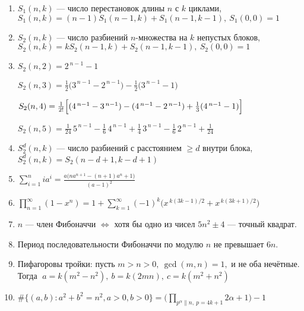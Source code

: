 \begin{enumerate}
\item %
$S_1(n,k)$ — число перестановок длины $n$ с $k$ циклами,
$S_1(n,k)=(n-1)S_1(n-1,k)+S_1(n-1,k-1),\ S_1(0,0)=1$

\item %
$S_2(n,k)$ — число разбиений $n$-множества на $k$ непустых блоков,
$S_2(n,k)=kS_2(n-1,k)+S_2(n-1,k-1),\ S_2(0,0)=1$

\item %
$S_2(n,2)=2^{\,n-1}-1$

$S_2(n,3)=\tfrac{1}{2}\bigl(3^{\,n-1}-2^{\,n-1}\bigr)-\tfrac{1}{2}\bigl(3^{\,n-1}-1\bigr)$

$S_2(n,4)=\tfrac{1}{2!}\Bigl[(4^{\,n-1}-3^{\,n-1})-(4^{\,n-1}-2^{\,n-1})+\tfrac{1}{3}(4^{\,n-1}-1)\Bigr]$

$S_2(n,5)=\tfrac{1}{24}\,5^{\,n-1}-\tfrac{1}{6}\,4^{\,n-1}
+\tfrac{1}{4}\,3^{\,n-1}-\tfrac{1}{6}\,2^{\,n-1}+\tfrac{1}{24}$

\item %
$S_2^d(n,k)$ — число разбиений с расстоянием $\ge d$ внутри блока,
$S_2^d(n,k)=S_2(n-d+1,k-d+1)$

\item %
$\sum_{i=1}^n i a^i=\frac{a\bigl(n a^{n+1}-(n+1)a^n+1\bigr)}{(a-1)^2}$

\item %
$\prod_{n=1}^\infty(1-x^n)=1+\sum_{k=1}^{\infty}(-1)^k\bigl(x^{\,k(3k-1)/2}+x^{\,k(3k+1)/2}\bigr)$

\item %
$n$ — член Фибоначчи $\iff$ хотя бы одно из чисел $5n^2\pm4$ — точный квадрат.

\item %
Период последовательности Фибоначчи по модулю $n$ не превышает $6n$.

\item %
Пифагоровы тройки: пусть $m>n>0,\ \gcd(m,n)=1,$ и не оба нечётные. Тогда
$\;a=k(m^2-n^2),\ b=k(2mn),\ c=k(m^2+n^2)$


\item %
$\displaystyle \#\{(a,b):a^2+b^2=n^2,a>0,b>0\}
=\Big(\prod_{p^\alpha\parallel n,\ p = 4k+1}2\alpha+1\Big)-1$


\end{enumerate}
